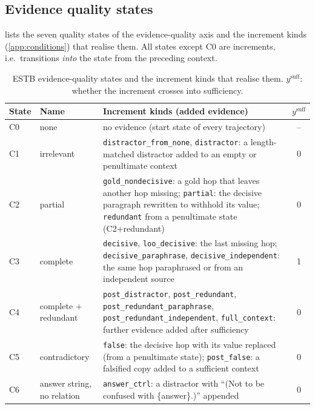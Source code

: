 \subsection{Evidence quality states}
\label{app:estb-quality}

 lists the seven quality states of the evidence-quality axis and the increment kinds (\cref{app:conditions}) that realise them. All states except C0 are increments, i.e.\ transitions \emph{into} the state from the preceding context.

\begin{table}[t]
\centering\scriptsize
\setlength{\tabcolsep}{3pt}
\begin{tabular}{llp{6.4cm}c}
\toprule
State & Name & Increment kinds (added evidence) & $y^{\mathrm{suff}}$ \\
\midrule
C0 & none & no evidence (start state of every trajectory) & -- \\
C1 & irrelevant & \texttt{distractor\_from\_none}, \texttt{distractor}: a length-matched distractor added to an empty or penultimate context & 0 \\
C2 & partial & \texttt{gold\_nondecisive}: a gold hop that leaves another hop missing; \texttt{partial}: the decisive paragraph rewritten to withhold its value; \texttt{redundant} from a penultimate state (C2+redundant) & 0 \\
C3 & complete & \texttt{decisive}, \texttt{loo\_decisive}: the last missing hop; \texttt{decisive\_paraphrase}, \texttt{decisive\_independent}: the same hop paraphrased or from an independent source & 1 \\
C4 & complete + redundant & \texttt{post\_distractor}, \texttt{post\_redundant}, \texttt{post\_redundant\_paraphrase}, \texttt{post\_redundant\_independent}, \texttt{full\_context}: further evidence added after sufficiency & 0 \\
C5 & contradictory & \texttt{false}: the decisive hop with its value replaced (from a penultimate state); \texttt{post\_false}: a falsified copy added to a sufficient context & 0 \\
C6 & answer string, no relation & \texttt{answer\_ctrl}: a distractor with ``(Not to be confused with \{answer\}.)'' appended & 0 \\
\bottomrule
\end{tabular}
\caption{ESTB evidence-quality states and the increment kinds that realise them. $y^{\mathrm{suff}}$: whether the increment crosses into sufficiency.}
\label{tab:estb-states}
\end{table}

